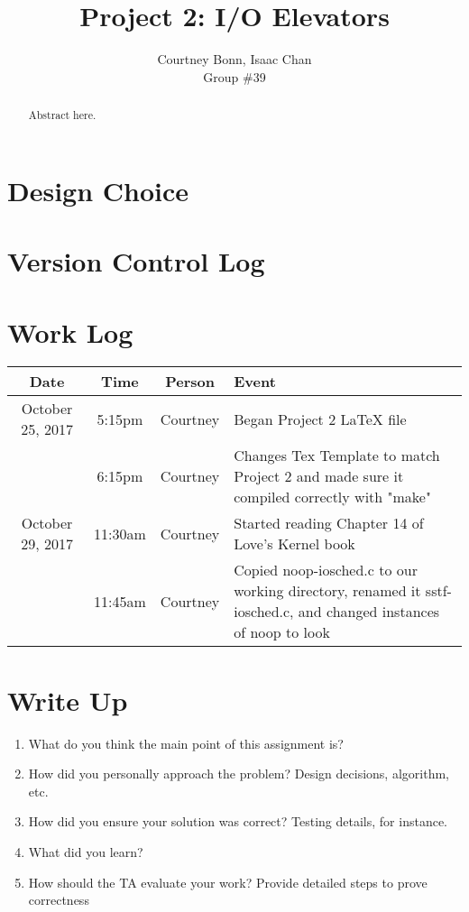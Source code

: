 \documentclass[letterpaper,10pt,draftclsnofoot,onecolumn,titlepage]{IEEEtran}
\def\name{Courtney Bonn, Isaac Chan}
\def\grp{Group \#39}
\begin{document}
\title{Project 2: I/O Elevators}
\author{\name \\ \grp}

\maketitle

\begin{abstract}
Abstract here.
\end{abstract}

\clearpage
\section{Design Choice}
    
\section{Version Control Log}
%

\section{Work Log}
\begin{center}
\begin{tabular}{ c c c l }
 Date  & Time & Person & Event \\ \hline
October 25, 2017 & 5:15pm & Courtney & Began Project 2 LaTeX file \\
		 & 6:15pm & Courtney & Changes Tex Template to match Project 2 and made sure it compiled correctly with "make" \\
October 29, 2017 & 11:30am & Courtney & Started reading Chapter 14 of Love's Kernel book \\                 
		 & 11:45am & Courtney & Copied noop-iosched.c to our working directory, renamed it sstf-iosched.c, and changed instances of noop to look \\ 
\end{tabular}
\end{center}

\section{Write Up}
\begin{enumerate}
                \item What do you think the main point of this assignment is?
                \item How did you personally approach the problem? Design decisions, algorithm, etc.
                \item How did you ensure your solution was correct? Testing details, for instance.
                \item What did you learn?
                \item How should the TA evaluate your work? Provide detailed steps to prove correctness 
\end{enumerate}
\end{document}
